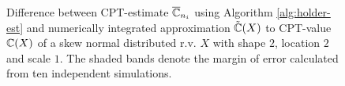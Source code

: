 \begin{figure}
    \centering
{}
			\caption{Difference between CPT-estimate $\overline {\mathbb{C}}_{n_i}$ using Algorithm \ref{alg:holder-est} and numerically integrated approximation $\tilde {\mathbb{C}}(X)$ to CPT-value $\mathbb{C}(X)$ of a skew normal distributed r.v. $X$ with shape $2$, location $2$ and scale $1$. The shaded bands denote the margin of error calculated from ten independent simulations. }
      \label{fig:cpt-est} 
			\end{figure}
